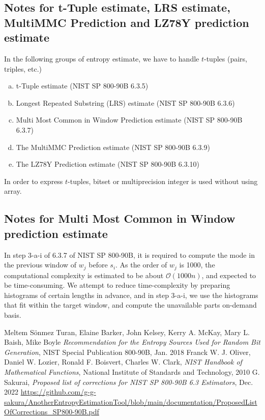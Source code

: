﻿\documentclass[a4paper,xelatex,english]{bxjsarticle}
\begin{document}
\subsection{Notes for t-Tuple estimate, LRS estimate, MultiMMC Prediction and LZ78Y prediction estimate}
In the following groups of entropy estimate, we have to handle $t$-tuples (pairs, triples, etc.)
\begin{enumerate}[a)]
	\item t-Tuple estimate (NIST SP 800-90B 6.3.5)
	\item Longest Repeated Substring (LRS) estimate (NIST SP 800-90B 6.3.6)
	\item Multi Most Common in Window Prediction estimate (NIST SP 800-90B 6.3.7)
	\item The MultiMMC Prediction estimate (NIST SP 800-90B 6.3.9)
	\item The LZ78Y Prediction estimate (NIST SP 800-90B 6.3.10)
\end{enumerate}
In order to express $t$-tuples, bitset or multiprecision integer is used without using array.

\subsection{Notes for Multi Most Common in Window prediction estimate}
In step 3-a-i of 6.3.7 of NIST SP 800-90B, it is required to compute the mode in the previous window of $w_{j}$ before $s_{i}$. 
As the order of $w_{j}$ is 1000, the computational complexity is estimated to be about $\mathcal{O}(1000n)$, and expected to be time-consuming. 
We attempt to reduce time-complexity by preparing histograms of certain lengths in advance, and in step 3-a-i, we use the histograms that fit within the target window, and compute the unavailable parts on-demand basis.

\setcounter{section}{2}
\begin{thebibliography}{99}
Meltem S\"{o}nmez Turan,
Elaine Barker,
John Kelsey,
Kerry A. McKay,
Mary L. Baish,
Mike Boyle
\textit{Recommendation for the Entropy Sources Used for Random Bit Generation},
NIST Special Publication 800-90B, Jan. 2018
Franck W. J. Oliver,
Daniel W. Lozier,
Ronald F. Boisvert,
Charles W. Clark,
\textit{NIST Handbook of Mathematical Functions},
National Institute of Standards and Technology, 2010
G. Sakurai, \textit{Proposed list of corrections for NIST SP 800-90B 6.3 Estimators}, Dec. 2022
\url{https://github.com/g-g-sakura/AnotherEntropyEstimationTool/blob/main/documentation/ProposedListOfCorrections_SP800-90B.pdf}

\end{thebibliography}
\end{document}
